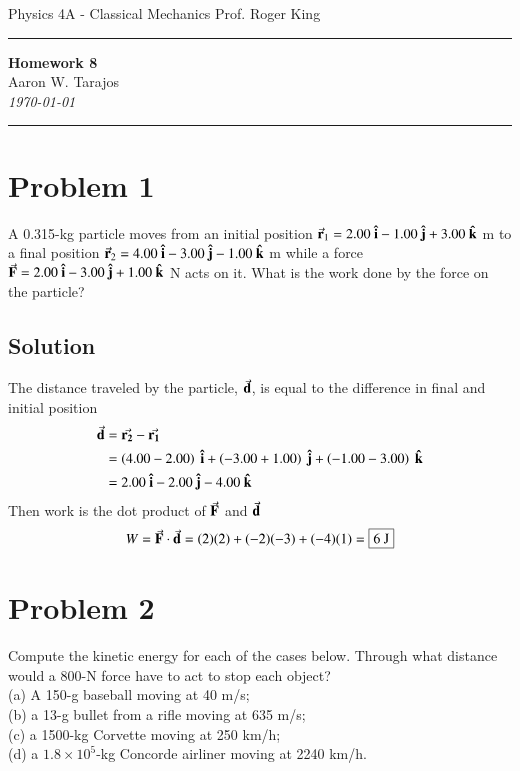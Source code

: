 \documentclass{article}
\begin{document}
\noindent
Physics 4A - Classical Mechanics \hfill Prof. Roger King

\noindent\rule{\textwidth}{0.4pt}

\begin{center}
    \textbf{\LARGE Homework 8} \\
    \vspace{12pt}
    \large Aaron W. Tarajos \\
    \textit{\today}
\end{center}

\noindent\rule{\textwidth}{0.4pt}

\section*{Problem 1}
A 0.315-kg particle moves from an initial position $\va{r}_1 = 2.00\ \vu{i} - 1.00\ \vu{j} + 3.00\ \vu{k}$ m to a final position $\va{r}_2 = 4.00\ \vu{i} - 3.00\ \vu{j} - 1.00\ \vu{k}$ m while a force $\va{F} = 2.00\ \vu{i} - 3.00\ \vu{j} + 1.00\ \vu{k}$ N acts on it. What is the work done by the force on the particle?

\subsection*{Solution}
The distance traveled by the particle, $\va{d}$, is equal to the difference in final and initial position
\begin{align*}
	\va{d} &= \va{r_2} - \va{r_1} \\
	       &= \left( 4.00 - 2.00 \right)\ \vu{i} + \left( -3.00 + 1.00 \right)\ \vu{j} + \left( -1.00 -3.00 \right)\ \vu{k} \\
	       &= 2.00\ \vu{i} - 2.00\ \vu{j} - 4.00\ \vu{k}
\end{align*}
Then work is the dot product of $\va{F}$ and $\va{d}$
\[
	W = \va{F} \cdot \va{d} = (2)(2) + (-2)(-3) + (-4)(1) = \boxed{6\ \text{J}}
\]

\section*{Problem 2}
Compute the kinetic energy for each of the cases below. Through what distance would a 800-N force have
to act to stop each object? \\
(a) A 150-g baseball moving at 40 m/s; \\
(b) a 13-g bullet from a rifle moving at 635 m/s; \\
(c) a 1500-kg Corvette moving at 250 km/h; \\
(d) a $1.8 \times 10^5$-kg Concorde airliner moving at 2240
km/h.
\end{document}
